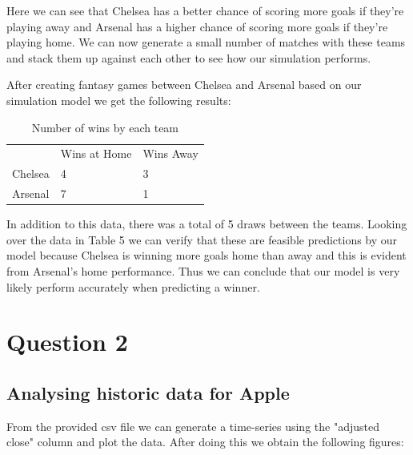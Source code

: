 \documentclass[11pt]{report}
\begin{document}
\noindent
Here we can see that Chelsea has a better chance of scoring more goals if they're playing away and Arsenal has a higher chance of scoring more goals if they're playing home. We can now generate a small number of matches with these teams and stack them up against each other to see how our simulation performs.

\vspace{0.3cm}
\noindent
After creating fantasy games between Chelsea and Arsenal based on our simulation model we get the following results:

\begin{table}[ht]
\centering
\caption{Number of wins by each team}
\label{t6}
\begin{tabular}{lll}
        & Wins at Home & Wins Away \\
Chelsea & 4            & 3         \\
Arsenal & 7            & 1        
\end{tabular}
\end{table}

\noindent
In addition to this data, there was a total of 5 draws between the teams. Looking over the data in Table 5 we can verify that these are feasible predictions by our model because Chelsea is winning more goals home than away and this is evident from Arsenal's home performance. Thus we can conclude that our model is very likely perform accurately when predicting a winner.  

\newpage
\section{Question 2}
\subsection{Analysing historic data for Apple}

From the provided csv file we can generate a time-series using the "adjusted close" column and plot the data. After doing this we obtain the following figures:
\end{document}

